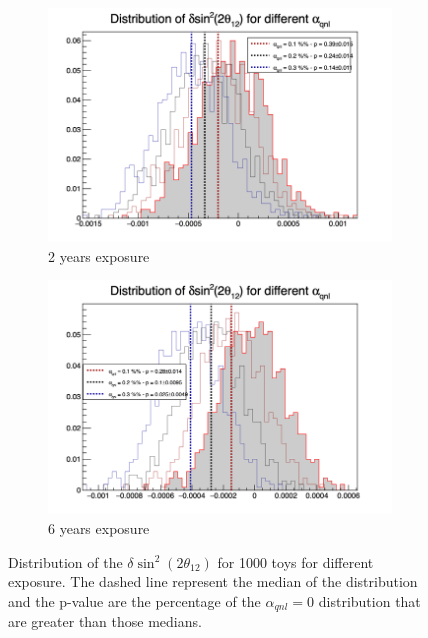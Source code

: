 \documentclass[../main.tex]{subfiles}
\begin{document}
\begin{figure}[th]
  \begin{subfigure}[t]{0.48\linewidth}
    \includegraphics[width=\linewidth]{images/joint_fit/stat_tests/chi2_delta_2y.png}
    \caption{2 years exposure}
  \end{subfigure}
  \begin{subfigure}[t]{0.48\linewidth}
    \includegraphics[width=\linewidth]{images/joint_fit/stat_tests/chi2_delta_6y.png}
    \caption{6 years exposure}
  \end{subfigure}
  \caption{Distribution of the $\delta \sin^2(2\theta_{12})$ for 1000 toys for different exposure. The dashed line represent the median of the distribution and the p-value are the percentage of the $\alpha_{qnl} = 0$ distribution that are greater than those medians.}
  \label{fig:joint_fit:chi2_delta}
\end{figure}
\end{document}
